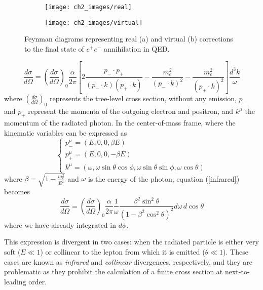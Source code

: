 \documentclass[10pt,a4paper]{book}
\begin{document}
\begin{figure}[ht]
\begin{subfigure}{.5\textwidth}
\centering
\texttt{[image: ch2\_images/real]}
\label{real}
\caption{}
\end{subfigure}
\begin{subfigure}{.5\textwidth}
\centering
\texttt{[image: ch2\_images/virtual]}
\label{virtual}
\caption{}
\end{subfigure}
\caption{Feynman diagrams representing real (a) and virtual (b) corrections to the final state of $e^+e^-$ annihilation in QED.}
\end{figure}

\begin{equation}
\frac{d\sigma}{d\Omega} = \left(\frac{d\sigma}{d\Omega} \right)_0 \frac{\alpha}{2\pi}\left[2\frac{p_- \cdot p_+}{(p_-\cdot k) (p_+ \cdot k)} - \frac{m_e^2}{(p_-\cdot k)^2} - \frac{m_e^2}{(p_+ \cdot k)^2} \right]\frac{d^3k}{\omega}
\label{infrared}
\end{equation}
where $\left(\frac{d\sigma}{d\Omega} \right)_0$ represents the tree-level cross section, without any emission, $p_-$ and $p_+$ represent the momenta of the outgoing electron and positron, and $k^\mu$ the momentum of the radiated photon. In the center-of-mass frame, where the kinematic variables can be expressed as
\begin{equation}
\begin{cases}
p_-^\mu = (E, 0, 0, \beta E)\\
p_+^\mu = (E, 0, 0, -\beta E)\\
k^\mu = (\omega, \omega \sin\theta\cos\phi, \omega\sin\theta\sin\phi, \omega\cos\theta)
\end{cases}
\end{equation}
where $\beta = \sqrt{1 - \frac{m_e^2}{E^2}}$ and $\omega$ is the energy of the photon, equation (\ref{infrared}) becomes
\begin{equation}
\frac{d\sigma}{d\Omega} = \left(\frac{d\sigma}{d\Omega} \right)_0 \frac{\alpha}{2\pi}\frac{1}{\omega}\frac{\beta^2\sin^2\theta}{(1-\beta^2\cos^2\theta)^2}d\omega \, d\cos\theta
\end{equation}
where we have already integrated in $d\phi$.

This expression is divergent in two cases: when the radiated particle is either very soft ($E \ll 1$) or collinear to the lepton from which it is emitted ($\theta \ll 1$). These cases are known as \emph{infrared} and \emph{collinear} divergences, respectively, and they are problematic as they prohibit the calculation of a finite cross section at next-to-leading order. 
\end{document}
